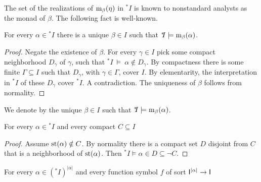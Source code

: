 \documentclass{amsproc}
\renewcommand*{\emph}[1]{%
   \smash{\tikz[baseline]\node[rectangle, fill=teal!25, rounded corners, inner xsep=0.5ex, inner ysep=0.2ex, anchor=base, minimum height = 2.7ex]{\strut #1};}}
\begin{document}

The set of the realizations of ${\rm m}_\beta(\eta)$ in ${}^*\!\!I$ is known to nonstandard analysts as the monad of $\beta$. 
The following fact is well-known.

\begin{fact}\label{fact_uniqueness_st}
  For every $\alpha\in{}^*\!\!I$ there is a unique $\beta\in I$ such that ${}^*\!\!I\models{\rm m}_\beta(\alpha)$.
\end{fact}

\begin{proof}
  Negate the existence of $\beta$.
  For every $\gamma\in I$ pick some compact neighborhood $D_\gamma$ of $\gamma$, such that ${}^*\!\!I\ \models\ \alpha\notin D_\gamma$.
  By compactness there is some finite $\Gamma\subseteq I$ such that $D_\gamma$, with $\gamma\in\Gamma$, cover $I$.
  By elementarity, the interpretation in ${}^*\!\!I$ of these $D_{\gamma}$ cover ${}^*\!\!I$.
  A contradiction.
  The uniqueness of $\beta$ follows from normality.
\end{proof}

We denote by \emph{${\rm st}(\alpha)$\/} the unique $\beta\in I$ such that ${}^*\!\!I\models{\rm m}_\beta(\alpha)$.

\begin{fact}\label{fact_st1}
  For every $\alpha\in{}^*\! I$ and every compact $C\subseteq I$

\end{fact}

\begin{proof}
  Assume ${\rm st}(\alpha)\notin C$.
  By normality there is a compact set $D$ disjoint from $C$ that is a neighborhood of ${\rm st}(\alpha)$.
  Then  ${}^*\!\!I\models\alpha\in D\subseteq\neg C$.
\end{proof}

\begin{fact}\label{fact_terms_st}
  For every $\alpha\in({}^*\!\!I)^{|\alpha|}$ and every function symbol $f$ of sort ${\sf I}^{|\alpha|}\to{\sf I}$

\end{fact}
\end{document}
